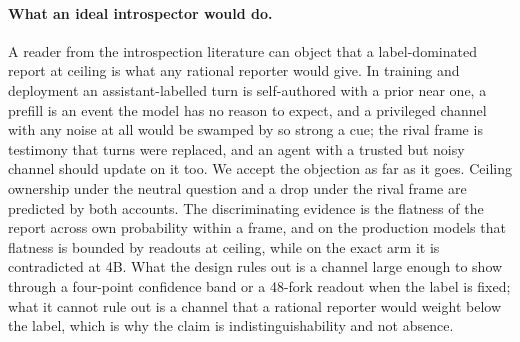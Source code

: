\documentclass[twocolumn,10pt]{article}
\begin{document}
\paragraph{What an ideal introspector would do.} A reader from the introspection literature can object that a label-dominated report at ceiling is what any rational reporter would give. In training and deployment an assistant-labelled turn is self-authored with a prior near one, a prefill is an event the model has no reason to expect, and a privileged channel with any noise at all would be swamped by so strong a cue; the rival frame is testimony that turns were replaced, and an agent with a trusted but noisy channel should update on it too. We accept the objection as far as it goes. Ceiling ownership under the neutral question and a drop under the rival frame are predicted by both accounts. The discriminating evidence is the flatness of the report across own probability within a frame, and on the production models that flatness is bounded by readouts at ceiling, while on the exact arm it is contradicted at 4B. What the design rules out is a channel large enough to show through a four-point confidence band or a 48-fork readout when the label is fixed; what it cannot rule out is a channel that a rational reporter would weight below the label, which is why the claim is indistinguishability and not absence.
\end{document}
